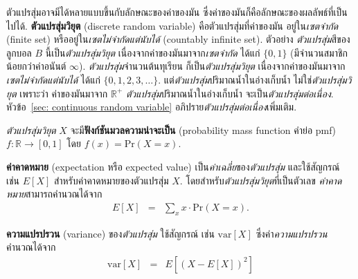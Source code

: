 ตัวแปรสุ่มอาจมีได้หลายแบบขึ้นกับลักษณะของค่าของมัน ซึ่งค่าของมันก็คือลักษณะของผลลัพธ์ที่เป็นไปได้.
\textbf{ตัวแปรสุ่มวิยุต} (discrete random variable)
คือตัวแปรสุ่มที่ค่าของมัน อยู่ใน\textit{เซตจำกัด} (finite set) หรืออยู่ใน\textit{เซตไม่จำกัดแต่นับได้} (countably infinite set).
ตัวอย่าง \textit{ตัวแปรสุ่ม}สีของลูกบอล $B$ นี้เป็น\textit{ตัวแปรสุ่มวิยุต}
เนื่องจากค่าของมันมาจาก\textit{เซตจำกัด} ได้แก่ $\{0, 1\}$ (มีจำนวนสมาชิกน้อยกว่าค่าอนันต์ $\infty$).
\textit{ตัวแปรสุ่ม}จำนวนต้นทุเรียน ก็เป็น\textit{ตัวแปรสุ่มวิยุต}
เนื่องจากค่าของมันมาจาก\textit{เซตไม่จำกัดแต่นับได้} ได้แก่ $\{0, 1, 2, 3, \ldots \}$.
แต่\textit{ตัวแปรสุ่ม}ปริมาณน้ำในอ่างเก็บน้ำ ไม่ใช่\textit{ตัวแปรสุ่มวิยุต}
เพราะว่า ค่าของมันมาจาก $\mathbb{R}^+$ 
\textit{ตัวแปรสุ่ม}ปริมาณน้ำในอ่างเก็บน้ำ จะเป็น\textit{ตัวแปรสุ่มต่อเนื่อง}.
หัวข้อ~\ref{sec: continuous random variable} อภิปราย\textit{ตัวแปรสุ่มต่อเนื่อง}เพิ่มเติม.

\textit{ตัวแปรสุ่มวิยุต} $X$ จะมี\textbf{ฟังก์ชันมวลความน่าจะเป็น} (probability mass function คำย่อ pmf) $f: \mathbb{R} \rightarrow [0,1]$ โดย $f(x) = \mathrm{Pr}(X = x)$.


\textbf{ค่าคาดหมาย} (expectation หรือ expected value) 
เป็น\textit{ค่าเฉลี่ย}ของ\textit{ตัวแปรสุ่ม}
และใช้สัญกรณ์ เช่น $E[X]$
สำหรับค่าคาดหมายของตัวแปรสุ่ม $X$.
โดยสำหรับ\textit{ตัวแปรสุ่มวิยุต}ที่เป็นตัวเลข
\textit{ค่าคาดหมาย}สามารถคำนวณได้จาก
\begin{eqnarray}
E[X] &=& \sum_x x \cdot \mathrm{Pr}(X=x)
\label{eq: prob expectation}.
\end{eqnarray}


\textbf{ความแปรปรวน} (variance)
ของ\textit{ตัวแปรสุ่ม}
ใช้สัญกรณ์ เช่น
$\mathrm{var}[X]$
ซึ่งค่า\textit{ความแปรปรวน} คำนวณได้จาก
\begin{eqnarray}
\mathrm{var}[X] &=& 
E[(X -E[X])^2]
\label{eq: prob variance}
\end{eqnarray}


